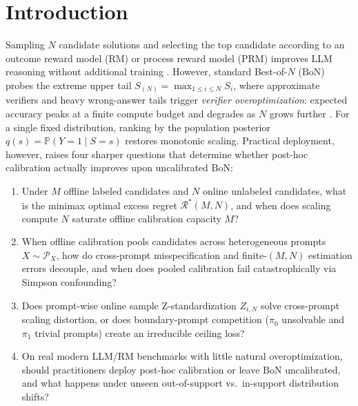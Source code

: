 \documentclass[10pt]{article}
\theoremstyle{plain}
\theoremstyle{definition}
\theoremstyle{remark}
\newcommand{\Prob}{\mathbb{P}}
\begin{document}
\section{Introduction}
\label{sec:intro}

Sampling $N$ candidate solutions and selecting the top candidate according to an outcome reward model (RM) or process reward model (PRM) improves LLM reasoning without additional training \citep{cobbe2021training,wang2023selfconsistency,lightman2024lets,brown2024large,snell2024scaling,wu2024inference}. However, standard Best-of-$N$ ($\mathrm{BoN}$) probes the extreme upper tail $S_{(N)} = \max_{1\le i\le N} S_i$, where approximate verifiers and heavy wrong-answer tails trigger \emph{verifier overoptimization}: expected accuracy peaks at a finite compute budget and degrades as $N$ grows further \citep{gao2023scaling,stroebl2024inference,beirami2025theoretical,huang2025best,dorner2025roc,yano2026tail,gui2026whether}. For a single fixed distribution, ranking by the population posterior $q(s) = \Prob(Y=1 \mid S=s)$ restores monotonic scaling. Practical deployment, however, raises four sharper questions that determine whether post-hoc calibration actually improves upon uncalibrated $\mathrm{BoN}$:
\begin{enumerate}[leftmargin=1.5em,itemsep=1pt,topsep=1pt]
    \item Under $M$ offline labeled candidates and $N$ online unlabeled candidates, what is the minimax optimal excess regret $\mathcal{R}^*(M, N)$, and when does scaling compute $N$ saturate offline calibration capacity $M$?
    \item When offline calibration pools candidates across heterogeneous prompts $X \sim \mathcal{P}_X$, how do cross-prompt misspecification and finite-$(M,N)$ estimation errors decouple, and when does pooled calibration fail catastrophically via Simpson confounding?
    \item Does prompt-wise online sample Z-standardization $Z_{i,N}$ solve cross-prompt scaling distortion, or does boundary-prompt competition ($\pi_0$ unsolvable and $\pi_1$ trivial prompts) create an irreducible ceiling loss?
    \item On real modern LLM/RM benchmarks with little natural overoptimization, should practitioners deploy post-hoc calibration or leave $\mathrm{BoN}$ uncalibrated, and what happens under unseen out-of-support vs.\ in-support distribution shifts?
\end{enumerate}
\end{document}
